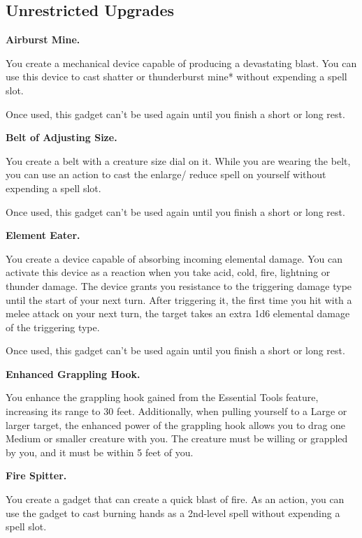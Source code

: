 \documentclass[11pt,twoside,openany]{book}  %
\begin{document}
\subsection{Unrestricted Upgrades}
\begin{fiveitemize}

	\item \textbf{Airburst Mine.}
	
	You create a mechanical device capable of producing a devastating blast. You can use this device to cast shatter or thunderburst mine* without expending a spell slot.

	Once used, this gadget can’t be used again until you finish a short or long rest.

	\item \textbf{Belt of Adjusting Size.}
	
	You create a belt with a creature size dial on it. While you are wearing the belt, you can use an action to cast the enlarge/ reduce spell on yourself without expending a spell slot.

	Once used, this gadget can’t be used again until you finish a short or long rest.

	\item \textbf{Element Eater.}
	
	You create a device capable of absorbing incoming elemental damage. You can activate this device as a reaction when you take acid, cold, fire, lightning or thunder damage. The device grants you resistance to the triggering damage type until the start of your next turn. After triggering it, the first time you hit with a melee attack on your next turn, the target takes an extra 1d6 elemental damage of the triggering type.

	Once used, this gadget can’t be used again until you finish a short or long rest.

	\item \textbf{Enhanced Grappling Hook.}
	
	You enhance the grappling hook gained from the Essential Tools feature, increasing its range to 30 feet. Additionally, when pulling yourself to a Large or larger target, the enhanced power of the grappling hook allows you to drag one Medium or smaller creature with you. The creature must be willing or grappled by you, and it must be within 5 feet of you.

	\item \textbf{Fire Spitter.}
	
	You create a gadget that can create a quick blast of fire. As an action, you can use the gadget to cast burning hands as a 2nd-level spell without expending a spell slot.


\end{fiveitemize}
\end{document}
